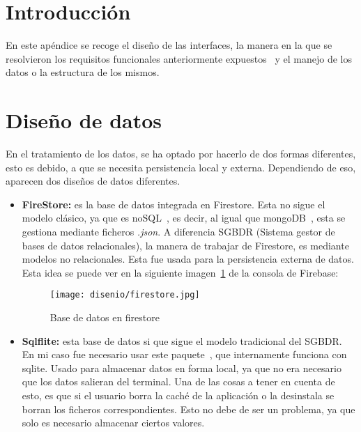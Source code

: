 
\section{Introducción}\label{diseño}
En este apéndice se recoge el diseño de las interfaces, la manera en la que se resolvieron los requisitos funcionales anteriormente expuestos~\pageref{requisitos} y el manejo de los datos o la estructura de los mismos.

\section{Diseño de datos}
En el tratamiento de los datos, se ha optado por hacerlo de dos formas diferentes, esto es debido, a que se necesita persistencia local y externa. Dependiendo de eso, aparecen dos diseños de datos diferentes.

\begin{itemize}
	\item \textbf{FireStore:} es la base de datos integrada en Firestore. Esta no sigue el modelo clásico, ya que es noSQL~\cite{wiki:nosql}, es decir, al igual que mongoDB~\cite{wiki:mongodb}, esta se gestiona mediante ficheros \emph{.json}. A diferencia SGBDR (Sistema gestor de bases de datos relacionales), la manera de trabajar de Firestore, es mediante modelos no relacionales. Esta fue usada para la persistencia externa de datos. Esta idea se puede ver en la siguiente imagen~\ref{fig:firestore} de la consola de Firebase:
	
	\begin{figure}[H]
		\centering
		\texttt{[image: disenio/firestore.jpg]}
		\caption{Base de datos en firestore}\label{fig:firestore}
	\end{figure}

	\item\label{sqlflite} \textbf{Sqlflite:} esta base de datos si que sigue el modelo tradicional del SGBDR. En mi caso fue necesario usar este paquete~\cite{package:sqlflite}, que internamente funciona con sqlite. Usado para almacenar datos en forma local, ya que no era necesario que los datos salieran del terminal. Una de las cosas a tener en cuenta de esto, es que si el usuario borra la caché de la aplicación o la desinstala se borran los ficheros correspondientes. Esto no debe de ser un problema, ya que solo es necesario almacenar ciertos valores.
	
\end{itemize}

